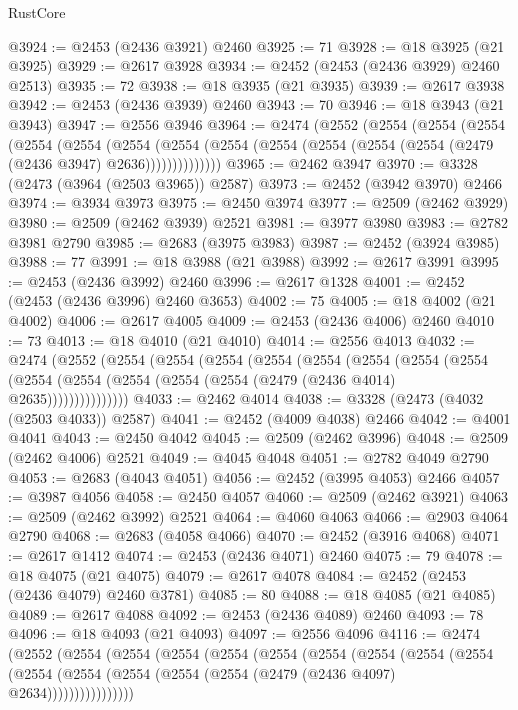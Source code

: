 \begin{lexlean}{RustCore}
\begin{coremodule}
@3924 := @2453 (@2436 @3921) @2460
@3925 := 71
@3928 := @18 @3925 (@21 @3925)
@3929 := @2617 @3928
@3934 := @2452 (@2453 (@2436 @3929) @2460 @2513)
@3935 := 72
@3938 := @18 @3935 (@21 @3935)
@3939 := @2617 @3938
@3942 := @2453 (@2436 @3939) @2460
@3943 := 70
@3946 := @18 @3943 (@21 @3943)
@3947 := @2556 @3946
@3964 := @2474
    (@2552
      (@2554
        (@2554
          (@2554
            (@2554
              (@2554
                (@2554
                  (@2554 (@2554 (@2554 (@2554 (@2554 (@2554 (@2479 (@2436 @3947) @2636))))))))))))))
@3965 := @2462 @3947
@3970 := @3328 (@2473 (@3964 (@2503 @3965)) @2587)
@3973 := @2452 (@3942 @3970) @2466
@3974 := @3934 @3973
@3975 := @2450 @3974
@3977 := @2509 (@2462 @3929)
@3980 := @2509 (@2462 @3939) @2521
@3981 := @3977 @3980
@3983 := @2782 @3981 @2790
@3985 := @2683 (@3975 @3983)
@3987 := @2452 (@3924 @3985)
@3988 := 77
@3991 := @18 @3988 (@21 @3988)
@3992 := @2617 @3991
@3995 := @2453 (@2436 @3992) @2460
@3996 := @2617 @1328
@4001 := @2452 (@2453 (@2436 @3996) @2460 @3653)
@4002 := 75
@4005 := @18 @4002 (@21 @4002)
@4006 := @2617 @4005
@4009 := @2453 (@2436 @4006) @2460
@4010 := 73
@4013 := @18 @4010 (@21 @4010)
@4014 := @2556 @4013
@4032 := @2474
    (@2552
      (@2554
        (@2554
          (@2554
            (@2554
              (@2554
                (@2554
                  (@2554
                    (@2554
                      (@2554 (@2554 (@2554 (@2554 (@2554 (@2479 (@2436 @4014) @2635)))))))))))))))
@4033 := @2462 @4014
@4038 := @3328 (@2473 (@4032 (@2503 @4033)) @2587)
@4041 := @2452 (@4009 @4038) @2466
@4042 := @4001 @4041
@4043 := @2450 @4042
@4045 := @2509 (@2462 @3996)
@4048 := @2509 (@2462 @4006) @2521
@4049 := @4045 @4048
@4051 := @2782 @4049 @2790
@4053 := @2683 (@4043 @4051)
@4056 := @2452 (@3995 @4053) @2466
@4057 := @3987 @4056
@4058 := @2450 @4057
@4060 := @2509 (@2462 @3921)
@4063 := @2509 (@2462 @3992) @2521
@4064 := @4060 @4063
@4066 := @2903 @4064 @2790
@4068 := @2683 (@4058 @4066)
@4070 := @2452 (@3916 @4068)
@4071 := @2617 @1412
@4074 := @2453 (@2436 @4071) @2460
@4075 := 79
@4078 := @18 @4075 (@21 @4075)
@4079 := @2617 @4078
@4084 := @2452 (@2453 (@2436 @4079) @2460 @3781)
@4085 := 80
@4088 := @18 @4085 (@21 @4085)
@4089 := @2617 @4088
@4092 := @2453 (@2436 @4089) @2460
@4093 := 78
@4096 := @18 @4093 (@21 @4093)
@4097 := @2556 @4096
@4116 := @2474
    (@2552
      (@2554
        (@2554
          (@2554
            (@2554
              (@2554
                (@2554
                  (@2554
                    (@2554
                      (@2554
                        (@2554
                          (@2554 (@2554 (@2554 (@2554 (@2479 (@2436 @4097) @2634))))))))))))))))

\end{coremodule}
\end{lexlean}
